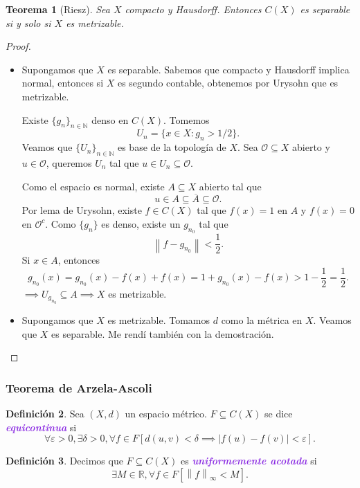 \documentclass{article}
\newtheorem{theorem}{Teorema}[subsection]
\theoremstyle{definition}
\newtheorem{definition}[theorem]{Definición}
\theoremstyle{remark}
\numberwithin{equation}{section}
\newcommand{\N}{\mathbb{N}}
\renewcommand{\O}{\mathcal{O}}
\newcommand{\R}{\mathbb{R}}
\newcommand{\e}{\varepsilon}
\newcommand{\oo}{\infty}
\renewcommand{\bar}{\overline}
\newcommand{\abs}[1]{\left| #1 \right|}
\newcommand{\norm}[1]{\left\lVert #1 \right\rVert}
\newcommand{\cor}[1]{\left[ #1 \right]}
\newcommand{\wea}[1]{\textcolor{BlueViolet}{\textbf{\emph{#1}}}}
\begin{document}
\begin{theorem}
  [Riesz]
  Sea $X$ compacto y Hausdorff. Entonces $C(X)$ es separable si y solo si $X$ es metrizable.
\end{theorem}
\begin{proof}\
  \begin{itemize}
    \item \boxed{\implies} Supongamos que $X$ es separable. Sabemos que compacto y Hausdorff implica normal, entonces si $X$ es segundo contable, obtenemos por Urysohn que es metrizable.

    Existe $\{g_n\}_{n\in\N}$ denso en $C(X)$. Tomemos
    \[U_n = \{x \in X \colon g_n > 1/2\}.\]
    Veamos que $\{U_n\}_{n\in\N}$ es base de la topología de $X$.
    Sea $\O \subseteq X$ abierto y $u \in \O$, queremos $U_n$ tal que $u \in U_n \subseteq \O$.

    Como el espacio es normal, existe $A \subseteq X$ abierto tal que
    \[u \in A \subseteq \bar A \subseteq \O.\]
    Por lema de Urysohn, existe $f \in C(X)$ tal que $f(x) = 1$ en $A$ y $f(x) = 0$ en $\O^c$.
    Como $\{g_n\}$ es denso, existe un $g_{n_0}$ tal que
    \[\norm{f-g_{n_0}} < \frac{1}{2}.\]
    Si $x \in A$, entonces
    \[g_{n_0}(x) = g_{n_0}(x) - f(x) + f(x) = 1 + g_{n_0}(x) - f(x) > 1 - \frac12 = \frac12.\]
    $\implies U_{g_{n_0}} \subseteq A \implies X$ es metrizable.

    \item \boxed{\impliedby} Supongamos que $X$ es metrizable. Tomamos $d$ como la métrica en $X$. Veamos que $X$ es separable. Me rendí también con la demostración.
  \end{itemize}
\end{proof}

\newpage
\subsubsection{Teorema de Arzela-Ascoli}

\begin{definition}
  Sea $(X,d)$ un espacio métrico. $F \subseteq C(X)$ se dice \wea{equicontinua} si
  \[\forall \e>0, \exists \delta>0, \forall f \in F \cor{
    d(u,v)<\delta \implies \abs{f(u) - f(v)} < \e
  }.\]
\end{definition}

\begin{definition}
  Decimos que $F \subseteq C(X)$ es \wea{uniformemente acotada} si
  \[\exists M \in \R, \forall f \in F \cor{\norm{f}_\oo < M}.\]
\end{definition}
\end{document}
